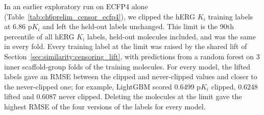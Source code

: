
In an earlier exploratory run on ECFP4 alone (Table~\ref{tab:ch6prelim_censor_ecfp4}), we clipped the hERG $K_i$ training labels at 6.86 p$K_i$ and left the held-out labels unchanged. This limit is the 90th percentile of all hERG $K_i$ labels, held-out molecules included, and was the same in every fold. Every training label at the limit was raised by the shared lift of Section~\ref{sec:similarity:censoring_lift}, with predictions from a random forest on 3 inner scaffold-group folds of the training molecules. For every model, the lifted labels gave an RMSE between the clipped and never-clipped values and closer to the never-clipped one; for example, LightGBM scored 0.6499 p$K_i$ clipped, 0.6248 lifted and 0.6087 never clipped. Deleting the molecules at the limit gave the highest RMSE of the four versions of the labels for every model.

